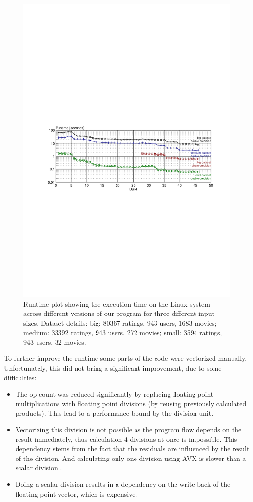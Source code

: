 \begin{figure}\centering
  \includegraphics[scale = 1, trim={7cm 11cm 6cm 14cm}]{graphics/runtime_plot.pdf}
  \caption{Runtime plot showing the execution time on the Linux system across different versions of our program for three different input sizes. Dataset details: big: 80367 ratings, 943 users, 1683 movies; medium: 33392 ratings, 943 users, 272 movies; small: 3594 ratings, 943 users, 32 movies.\label{runtime}}
\end{figure}

To further improve the runtime some parts of the code were vectorized manually. Unfortunately, this did not bring a significant improvement, due to some difficulties:
\begin{itemize}
	\item The op count was reduced significantly by replacing floating point multiplications with floating point divisions (by reusing previously calculated products). This lead to a performance bound by the division unit.
	\item Vectorizing this division is not possible as the program flow depends on the result immediately, thus calculation 4 divisions at once is impossible. This dependency stems from the fact that the residuals are influenced by the result of the division. And calculating only one division using AVX is slower than a scalar division \cite{intrinsics_guide}.
	\item Doing a scalar division results in a dependency on the write back of the floating point vector, which is expensive.
\end{itemize}
